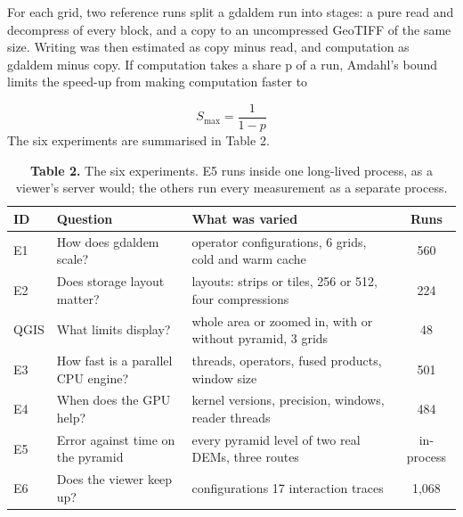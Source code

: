 \documentclass[10pt,a4paper]{article}
\begin{document}
For each grid, two reference runs split a gdaldem run into stages: a pure read and decompress of every block, and a copy to an uncompressed GeoTIFF of the same size. Writing was then estimated as copy minus read, and computation as gdaldem minus copy. If computation takes a share p of a run, Amdahl's bound limits the speed-up from making computation faster to

\begin{equation}S_{\max}=\frac{1}{1-p}\end{equation}
The six experiments are summarised in Table 2.

\begin{table}[H]
\centering\small
\caption*{\textbf{Table 2.} The six experiments. E5 runs inside one long-lived process, as a viewer's server would; the others run every measurement as a separate process.}
\begin{tabularx}{\linewidth}{l>{\centering\arraybackslash}X>{\centering\arraybackslash}Xc}
\toprule
\textbf{ID} & \textbf{Question} & \textbf{What was varied} & \textbf{Runs} \\
\midrule
E1 & How does gdaldem scale? & 10 operator configurations, 6 grids, cold and warm cache & 560 \\
E2 & Does storage layout matter? & 7 layouts: strips or tiles, 256 or 512, four compressions & 224 \\
QGIS & What limits display? & whole area or zoomed in, with or without pyramid, 3 grids & 48 \\
E3 & How fast is a parallel CPU engine? & threads, operators, fused products, window size & 501 \\
E4 & When does the GPU help? & kernel versions, precision, windows, reader threads & 484 \\
E5 & Error against time on the pyramid & every pyramid level of two real DEMs, three routes & in-process \\
E6 & Does the viewer keep up? & 24 configurations \texttimes{} 17 interaction traces & 1,068 \\
\bottomrule
\end{tabularx}
\end{table}
\end{document}
